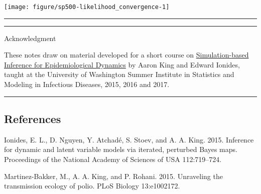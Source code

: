 \documentclass[]{article}
\newenvironment{Shaded}{\begin{snugshade}}{\end{snugshade}}
\newcommand{\KeywordTok}[1]{\textcolor[rgb]{0.13,0.29,0.53}{\textbf{#1}}}
\newcommand{\DataTypeTok}[1]{\textcolor[rgb]{0.13,0.29,0.53}{#1}}
\newcommand{\DecValTok}[1]{\textcolor[rgb]{0.00,0.00,0.81}{#1}}
\newcommand{\StringTok}[1]{\textcolor[rgb]{0.31,0.60,0.02}{#1}}
\newcommand{\OperatorTok}[1]{\textcolor[rgb]{0.81,0.36,0.00}{\textbf{#1}}}
\newcommand{\NormalTok}[1]{#1}
\begin{document}
\begin{Shaded}
\end{Shaded}

\begin{center}\texttt{[image: figure/sp500-likelihood\_convergence-1]} \end{center}

\begin{center}\rule{0.5\linewidth}{\linethickness}\end{center}

\begin{center}\rule{0.5\linewidth}{\linethickness}\end{center}

Acknowledgment

These notes draw on material developed for a short course on
\href{http://kingaa.github.io/sbied/}{Simulation-based Inference for
Epidemiological Dynamics} by Aaron King and Edward Ionides, taught at
the University of Washington Summer Institute in Statistics and Modeling
in Infectious Diseases, 2015, 2016 and 2017.

\begin{center}\rule{0.5\linewidth}{\linethickness}\end{center}

\subsection*{References}\label{references}

\hypertarget{refs}{}
\hypertarget{ref-ionides15}{}
Ionides, E. L., D. Nguyen, Y. Atchadé, S. Stoev, and A. A. King. 2015.
Inference for dynamic and latent variable models via iterated, perturbed
Bayes maps. Proceedings of the National Academy of Sciences of USA
112:719--724.

\hypertarget{ref-martinez-bakker15}{}
Martinez-Bakker, M., A. A. King, and P. Rohani. 2015. Unraveling the
transmission ecology of polio. PLoS Biology 13:e1002172.
\end{document}
